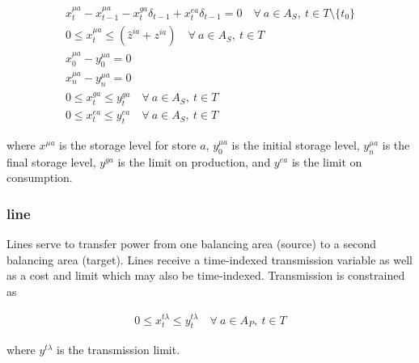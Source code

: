 \begin{gather}
	x^{\mu a}_t - x^{\mu a}_{t - 1} - x^{ga}_t\delta_{t - 1} + x^{ea}_t\delta_{t - 1} = 0\quad \forall\ a \in A_S,\ t \in T\setminus \{t_0\} \\
	0 \leq x^{\mu a}_t \leq (\hat{z}^{ia} + z^{ia}) \quad \forall\ a \in A_S,\ t \in T \\
	x^{\mu a}_0 - y^{\mu a}_0 = 0 \\
	x^{\mu a}_n - y^{\mu a}_n = 0 \\
	0 \leq x^{ga}_t \leq y^{ga}_t\quad \forall\ a \in A_S,\ t \in T \\
	0 \leq x^{ea}_t \leq y^{ea}_t\quad \forall\ a \in A_S,\ t \in T
\end{gather}

where $x^{\mu a}$ is the storage level for store $a$, $y^{\mu a}_0$ is the initial storage level,  $y^{\mu a}_n$ is the final storage level, $y^{ga}$ is the limit on production, and $y^{ea}$ is the limit on consumption.

\subsubsection{line}

Lines serve to transfer power from one balancing area (source) to a second balancing area (target). Lines receive a time-indexed transmission variable as well as a cost and limit which may also be time-indexed. Transmission is constrained as

\begin{gather}
	0 \leq x^{t\lambda}_t \leq y^{t\lambda}_t\quad \forall\ a \in A_P,\ t \in T
\end{gather}

where $y^{t\lambda}$ is the transmission limit.